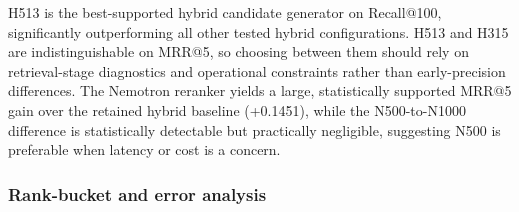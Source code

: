 H513 is the best-supported hybrid candidate generator on Recall@100, significantly outperforming all other tested hybrid configurations. H513 and H315 are indistinguishable on MRR@5, so choosing between them should rely on retrieval-stage diagnostics and operational constraints rather than early-precision differences. The Nemotron reranker yields a large, statistically supported MRR@5 gain over the retained hybrid baseline (+0.1451), while the N500-to-N1000 difference is statistically detectable but practically negligible, suggesting N500 is preferable when latency or cost is a concern.

\begin{table}[htbp]
    \centering
    \footnotesize
    \caption{Holm-corrected pairwise Wilcoxon signed-rank tests on the English TRAIN split, aligned with pipeline stage (retrieval $\rightarrow$ Recall@100; reranking $\rightarrow$ MRR@5). $\Delta$ differences are computed as the second system minus the first or as H513 minus each comparator for the aggregated retrieval-stage row.}\label{tab:formal-statistical-tests}

\end{table}




\subsubsection{Rank-bucket and error analysis}

